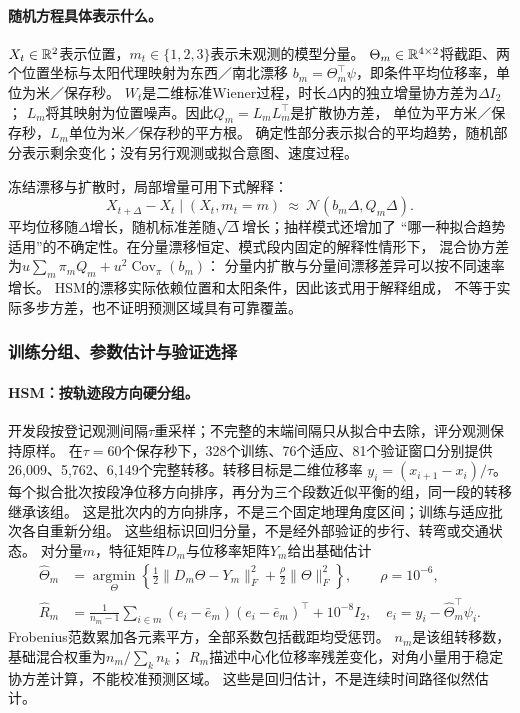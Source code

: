 \paragraph{随机方程具体表示什么。}
$X_t\in\mathbb{R}^2$表示位置，$m_t\in\{1,2,3\}$表示未观测的模型分量。
$\Theta_m\in\mathbb{R}^{4\times2}$将截距、两个位置坐标与太阳代理映射为东西／南北漂移
$b_m=\Theta_m^\top\psi$，即条件平均位移率，单位为米／保存秒。
$W_t$是二维标准Wiener过程，时长$\Delta$内的独立增量协方差为$\Delta I_2$；
$L_m$将其映射为位置噪声。因此$Q_m=L_mL_m^\top$是扩散协方差，
单位为平方米／保存秒，$L_m$单位为米／保存秒的平方根。
确定性部分表示拟合的平均趋势，随机部分表示剩余变化；没有另行观测或拟合意图、速度过程。

冻结漂移与扩散时，局部增量可用下式解释：
\begin{equation}\label{eq:local-increment}
 X_{t+\Delta}-X_t\mid(X_t,m_t=m)
 \ \approx\ \mathcal N\!\left(b_m\Delta,Q_m\Delta\right).
\end{equation}
平均位移随$\Delta$增长，随机标准差随$\sqrt\Delta$增长；抽样模式还增加了
“哪一种拟合趋势适用”的不确定性。在分量漂移恒定、模式段内固定的解释性情形下，
混合协方差为$u\sum_m\pi_mQ_m+u^2\operatorname{Cov}_{\pi}(b_m)$：
分量内扩散与分量间漂移差异可以按不同速率增长。
HSM的漂移实际依赖位置和太阳条件，因此该式用于解释组成，
不等于实际多步方差，也不证明预测区域具有可靠覆盖。

\subsubsection{训练分组、参数估计与验证选择}\label{sec:training-methods}
\paragraph{HSM：按轨迹段方向硬分组。}
开发段按登记观测间隔$\tau$重采样；不完整的末端间隔只从拟合中去除，评分观测保持原样。
在$\tau=60$个保存秒下，328个训练、76个适应、81个验证窗口分别提供
26,009、5,762、6,149个完整转移。转移目标是二维位移率
$y_i=(x_{i+1}-x_i)/\tau$。
每个拟合批次按段净位移方向排序，再分为三个段数近似平衡的组，同一段的转移继承该组。
这是批次内的方向排序，不是三个固定地理角度区间；训练与适应批次各自重新分组。
这些组标识回归分量，不是经外部验证的步行、转弯或交通状态。
对分量$m$，特征矩阵$D_m$与位移率矩阵$Y_m$给出基础估计
\begin{align}
 \widehat\Theta_m&=\underset{\Theta}{\operatorname{argmin}}
 \left\{\tfrac12\|D_m\Theta-Y_m\|_F^2+
             \tfrac\rho2\|\Theta\|_F^2\right\},
 \qquad \rho=10^{-6},\label{eq:main-full-fit}\\
 \widehat R_m&=\frac1{n_m-1}\sum_{i\in m}
 (e_i-\bar e_m)(e_i-\bar e_m)^\top+10^{-8}I_2,
 \quad e_i=y_i-\widehat\Theta_m^\top\psi_i .
 \label{eq:main-full-residual}
\end{align}
Frobenius范数累加各元素平方，全部系数包括截距均受惩罚。
$n_m$是该组转移数，基础混合权重为$n_m/\sum_k n_k$；
$R_m$描述中心化位移率残差变化，对角小量用于稳定协方差计算，不能校准预测区域。
这些是回归估计，不是连续时间路径似然估计。

